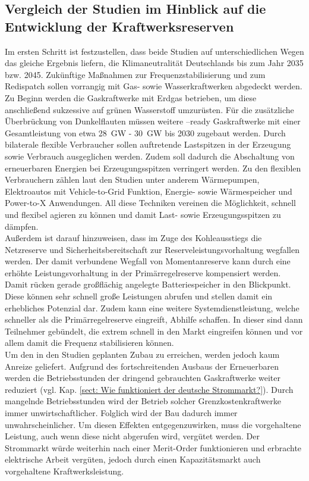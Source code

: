 	\subsection{Vergleich der Studien im Hinblick auf die Entwicklung der Kraftwerksreserven}
	
		Im ersten Schritt ist festzustellen, dass beide Studien auf unterschiedlichen Wegen das gleiche Ergebnis liefern, die Klimaneutralität Deutschlands bis zum Jahr 2035 bzw. 2045.
		Zukünftige Maßnahmen zur Frequenzstabilisierung und zum Redispatch sollen vorrangig mit Gas- sowie Wasserkraftwerken abgedeckt werden.
		Zu Beginn werden die Gaskraftwerke mit Erdgas betrieben, um diese anschließend sukzessive auf grünen Wasserstoff umzurüsten.
		Für die zusätzliche Überbrückung von Dunkelflauten müssen weitere \Htwo--ready Gaskraftwerke mit einer Gesamtleistung von etwa \SI{28}{\giga\watt} - \SI{30}{\giga\watt} bis 2030 zugebaut werden.
		Durch bilaterale flexible Verbraucher sollen auftretende Lastspitzen in der Erzeugung sowie Verbrauch ausgeglichen werden.
		Zudem soll dadurch die Abschaltung von erneuerbaren Energien bei Erzeugungsspitzen verringert werden.
		Zu den flexiblen Verbrauchern zählen laut den Studien unter anderem Wärmepumpen, Elektroautos mit Vehicle-to-Grid Funktion, Energie- sowie Wärmespeicher und Power-to-X Anwendungen.
		All diese Techniken vereinen die Möglichkeit, schnell und flexibel agieren zu können und damit Last- sowie Erzeugungsspitzen zu dämpfen. \\
		
		Außerdem ist darauf hinzuweisen, dass im Zuge des Kohleausstiegs die Netzreserve und Sicherheitsbereitschaft zur Reserveleistungsvorhaltung wegfallen werden.
		Der damit verbundene Wegfall von Momentanreserve kann durch eine erhöhte Leistungsvorhaltung in der Primärregelreserve kompensiert werden.
		Damit rücken gerade großflächig angelegte Batteriespeicher in den Blickpunkt.
		Diese können sehr schnell große Leistungen abrufen und stellen damit ein erhebliches Potenzial dar. 
		Zudem kann eine weitere Systemdienstleistung, welche schneller als die Primärregelreserve eingreift, Abhilfe  schaffen.
		In dieser sind dann Teilnehmer gebündelt, die extrem schnell in den Markt eingreifen können und vor allem damit die Frequenz stabilisieren können. \\
		
		Um den in den Studien geplanten Zubau zu erreichen, werden jedoch kaum Anreize geliefert.
		Aufgrund des fortschreitenden Ausbaus der Erneuerbaren werden die Betriebsstunden der dringend gebrauchten Gaskraftwerke weiter reduziert (vgl. Kap. \ref{sect: Wie funktioniert der deutsche Strommarkt?}).
		Durch mangelnde Betriebsstunden wird der Betrieb solcher Grenzkostenkraftwerke immer unwirtschaftlicher.
		Folglich wird der Bau dadurch immer unwahrscheinlicher.
		Um diesen Effekten entgegenzuwirken, muss die vorgehaltene Leistung, auch wenn diese nicht abgerufen wird, vergütet werden.
		Der Strommarkt würde weiterhin nach einer Merit-Order funktionieren und erbrachte elektrische Arbeit vergüten, jedoch durch einen Kapazitätsmarkt auch vorgehaltene Kraftwerksleistung. \\
		
